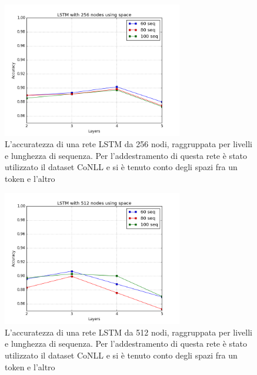 \begin{figure}[H]
  \centering
  \begin{center}
    \includegraphics[width=0.7\textwidth]{./images/plots/english/accuracy_256n_word_min_loss_using_spaces.png}
  \end{center}
  \caption{L'accuratezza di una rete LSTM da 256 nodi, raggruppata per livelli e
          lunghezza di sequenza. Per l'addestramento di questa rete \`e stato
          utilizzato il dataset CoNLL e si \`e tenuto conto degli spazi fra un
          token e l'altro}
  \label{fig:accEng256sp}
\end{figure}

\begin{figure}[H]
  \centering
  \begin{center}
    \includegraphics[width=0.7\textwidth]{./images/plots/english/accuracy_512n_word_min_loss_using_spaces.png}
  \end{center}
  \caption{L'accuratezza di una rete LSTM da 512 nodi, raggruppata per livelli e
          lunghezza di sequenza. Per l'addestramento di questa rete \`e stato
          utilizzato il dataset CoNLL e si \`e tenuto conto degli spazi fra un
          token e l'altro}
  \label{fig:accEng512sp}
\end{figure}

